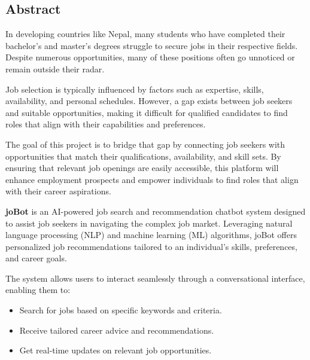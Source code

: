 \documentclass[a4paper,12pt]{report}
\begin{document}
    

    \tableofcontents
    \newpage

    \begin{center}
        \section*{Abstract}
    \end{center}

        In developing countries like Nepal, many students who have completed their bachelor's and master's degrees struggle to secure jobs in their respective fields. Despite numerous opportunities, many of these positions often go unnoticed or remain outside their radar.

        Job selection is typically influenced by factors such as expertise, skills, availability, and personal schedules. However, a gap exists between job seekers and suitable opportunities, making it difficult for qualified candidates to find roles that align with their capabilities and preferences.

        The goal of this project is to bridge that gap by connecting job seekers with opportunities that match their qualifications, availability, and skill sets. By ensuring that relevant job openings are easily accessible, this platform will enhance employment prospects and empower individuals to find roles that align with their career aspirations.

        \textbf{joBot} is an AI-powered job search and recommendation chatbot system designed to assist job seekers in navigating the complex job market. Leveraging natural language processing (NLP) and machine learning (ML) algorithms, joBot offers personalized job recommendations tailored to an individual's skills, preferences, and career goals.

        The system allows users to interact seamlessly through a conversational interface, enabling them to:
        \begin{itemize}
            \item Search for jobs based on specific keywords and criteria.
            \item Receive tailored career advice and recommendations.
            \item Get real-time updates on relevant job opportunities.
        \end{itemize}
\end{document}
